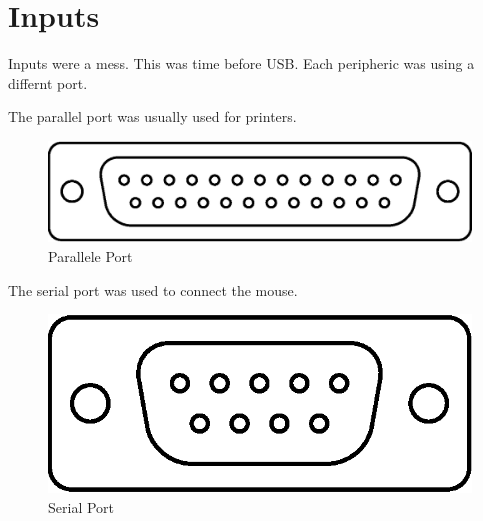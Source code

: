\documentclass[book.tex]{subfiles}
\begin{document}
\section{Inputs}
Inputs were a mess. This was time before USB. Each peripheric was using a differnt port.

The parallel port was usually used for printers.
 \begin{figure}[H]
\centering
\includegraphics[scale=0.7]{imgs/ports/DB-25_parallel_port.eps}
%
\caption{Parallele Port}
\label{fig:parallelPort}
\end{figure}


The serial port was used to connect the mouse.
 \begin{figure}[H]
\centering
\includegraphics[scale=0.7]{imgs/ports/DE9_serial_port.eps}
%
\caption{Serial Port}
\label{fig:serialPort}
\end{figure}
\end{document}
